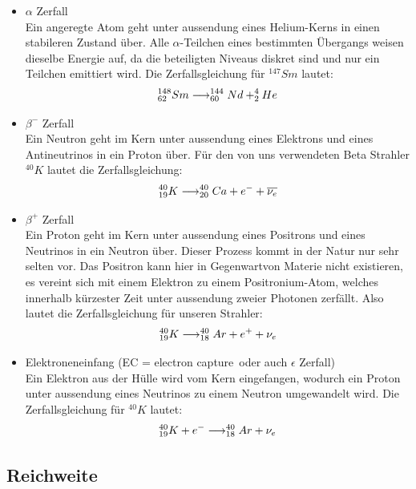 \documentclass[12pt]{article}
\begin{document}
\begin{itemize}
 \item $\alpha$ Zerfall \\
Ein angeregte Atom geht unter aussendung eines Helium-Kerns in einen stabileren Zustand über. Alle $\alpha$-Teilchen eines bestimmten Übergangs weisen dieselbe Energie auf, da die beteiligten Niveaus diskret sind und nur ein Teilchen emittiert wird. Die Zerfallsgleichung für $^{147}Sm$ lautet:
\begin{align}
 \notag ^{148}_{62}Sm \longrightarrow ^{144}_{60}Nd + ^4_2He
\end{align}

\item $\beta^-$ Zerfall \\
Ein Neutron geht im Kern unter aussendung eines Elektrons und eines Antineutrinos in ein Proton über. Für den von uns verwendeten Beta Strahler $^{40}K$ lautet die Zerfallsgleichung:
\begin{align}
 \notag ^{40}_{19}K \longrightarrow ^{40}_{20}Ca + e^- + \overline{\nu_e}
\end{align}

\item $\beta^+$ Zerfall \\
Ein Proton geht im Kern unter aussendung eines Positrons und eines Neutrinos in ein Neutron über. Dieser Prozess kommt in der Natur nur sehr selten vor. Das Positron kann hier in Gegenwartvon Materie nicht existieren, es vereint sich mit einem Elektron zu einem Positronium-Atom, welches innerhalb kürzester Zeit unter aussendung zweier Photonen zerfällt. Also lautet die Zerfallsgleichung für unseren Strahler:
\begin{align}
 \notag ^{40}_{19}K \longrightarrow ^{40}_{18}Ar + e^+ + \nu_e
\end{align}

\item Elektroneneinfang (\dq EC = electron capture\dq ~oder auch  \dq$\epsilon$ Zerfall\dq) \\
Ein Elektron aus der Hülle wird vom Kern eingefangen, wodurch ein Proton unter aussendung eines Neutrinos zu einem Neutron umgewandelt wird. Die Zerfallsgleichung für $^{40}K$ lautet:
\begin{align}
 \notag ^{40}_{19}K + e^- \longrightarrow ^{40}_{18}Ar + \nu_e
\end{align}
\end{itemize}

\subsection{Reichweite}
\end{document}

